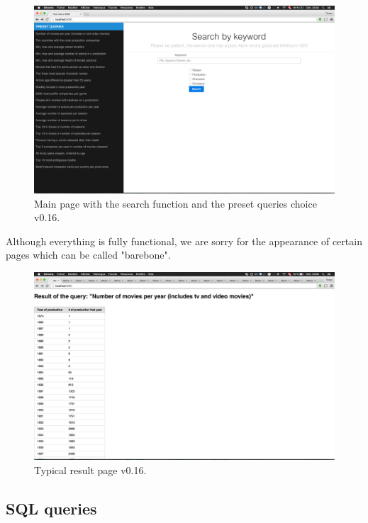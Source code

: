 \documentclass{article}
\begin{document}
\begin{figure}[H]
        \includegraphics[width=\linewidth]{main_frame.png}
        \captionsetup{justification=centering}
        \caption{Main page with the search function and the preset queries choice v0.16.}
    \end{figure}

Although everything is fully functional, we are sorry for the appearance of certain pages which can be called "barebone".

\begin{figure}[H]
        \includegraphics[width=\linewidth]{result.png}
        \captionsetup{justification=centering}
        \caption{Typical result page v0.16.}
    \end{figure}


\subsection{SQL queries}
\end{document}
